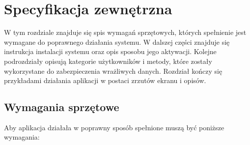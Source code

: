 \documentclass[a4paper,twoside,12pt]{book}
\begin{document}
\chapter{Specyfikacja zewnętrzna}
W tym rozdziale znajduje się spis wymagań sprzętowych, których spełnienie jest wymagane do poprawnego działania systemu. W dalszej części znajduje się instrukcja instalacji systemu oraz opis sposobu jego aktywacji. Kolejne podrozdziały opisują kategorie użytkowników i metody, które zostały wykorzystane do zabezpieczenia wrażliwych danych. Rozdział kończy się przykładami działania aplikacji w postaci zrzutów ekranu i opisów.

\section {Wymagania sprzętowe}
Aby aplikacja działała w poprawny sposób spełnione muszą być poniższe wymagania:
\end{document}
